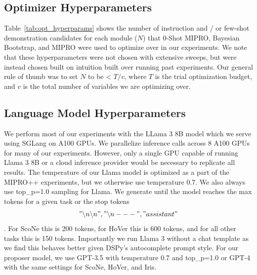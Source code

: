 \subsection{Optimizer Hyperparameters}
Table~\ref{tab:opt_hyperparams} shows the number of instruction and / or few-shot demonstration candidates for each module ($N$) that 0-Shot MIPRO, Bayesian Bootstrap, and MIPRO were used to optimize over in our experiments. We note that these hyperparameters were not chosen with extensive sweeps, but were instead chosen built on intuition built over running past experiments. Our general rule of thumb was to set $N$ to be < $T/v$, where $T$ is the trial optimization budget, and $v$ is the total number of variables we are optimizing over.

\subsection{Language Model Hyperparameters}
We perform most of our experiments with the LLama 3 8B model \cite{llama3modelcard} which we serve using SGLang \cite{zheng2024sglang} on A100 GPUs.  We parallelize inference calls across 8 A100 GPUs for many of our experiments. However, only a single GPU capable of running Llama 3 8B or a cloud inference provider would be necessary to replicate all results.  The temperature of our Llama model is optimized as a part of the MIPRO++ experiments, but we otherwise use temperature 0.7.  We also always use top\_p=1.0 sampling for Llama.  We generate until the model reaches the max tokens for a given task or the stop tokens \texttt{\["\backslash n \backslash n", "\backslash n---", "assistant"\]}.  For ScoNe this is 200 tokens, for HoVer this is 600 tokens, and for all other tasks this is 150 tokens.  Importantly we run Llama 3 without a chat template as we find this behaves better given DSPy's autocomplete prompt style.  For our proposer model, we use GPT-3.5 with temperature 0.7 and top\_p=1.0 or GPT-4 with the same settings for ScoNe, HoVer, and Iris.

